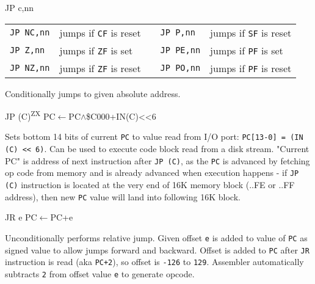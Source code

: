 \documentclass[twoside,openright,a4paper]{book}
\newcommand{\ZXN}{\textnormal{\textsuperscript{ZX}}}
\begin{document}
\begin{basedescript}{
	\desclabelstyle{\multilinelabel}
	\desclabelwidth{3cm}}
\begin{detailitem}{JP c,nn}
\begin{tabular}{@{}llcll}
			{\tt JP NC,nn} & jumps if {\tt CF} is reset & &
				{\tt JP P,nn} & jumps if {\tt SF} is reset\\

			{\tt JP Z,nn} & jumps if {\tt ZF} is set & &
				{\tt JP PE,nn} & jumps if {\tt PF} is set\\

			{\tt JP NZ,nn} & jumps if {\tt ZF} is reset & &
				{\tt JP PO,nn} & jumps if {\tt PF} is reset\\
		\end{tabular}

		Conditionally jumps to given absolute address.

		\DetailNoEffect
				
		\begin{DetailTiming}
		\end{DetailTiming}

	\end{detailitem}

	\begin{detailitem}{JP (C)\ZXN}
		{PC$\leftarrow$PC$\wedge$\$C000+IN(C)<<6}

		Sets bottom 14 bits of current {\tt PC} to value read from I/O port: {\tt PC[13-0] = (IN (C) << 6)}. Can be used to execute code block read from a disk stream. "Current PC" is address of next instruction after {\tt JP (C)}, as the {\tt PC} is advanced by fetching op code from memory and is already advanced when execution happens - if {\tt JP (C)} instruction is located at the very end of 16K memory block (..FE or ..FF address), then new {\tt PC} value will land into following 16K block.

		\DetailNoEffect
				
		\begin{DetailTiming}
			\DetailTime{}{3}{13}
		\end{DetailTiming}

	\end{detailitem}

	\pagebreak
	\begin{detailitem}{JR e}
		{PC$\leftarrow$PC+e}
		
		Unconditionally performs relative jump. Given offset {\tt e} is added to value of {\tt PC} as signed value to allow jumps forward and backward. Offset is added to {\tt PC} after {\tt JR} instruction is read (aka {\tt PC+2}), so offset is {\tt -126} to {\tt 129}. Assembler automatically subtracts {\tt 2} from offset value {\tt e} to generate opcode.


\end{detailitem}
\end{basedescript}
\end{document}
